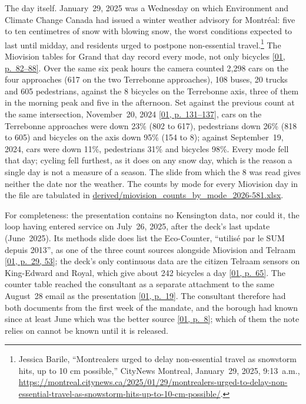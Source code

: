 \documentclass[11pt,letterpaper]{article}
\newcommand{\repourl}{https://github.com/OpenMobilityData/Terrebonne-access-requests}
\newcommand{\doc}[2]{\href{\repourl/blob/main/#1}{#2}}
\newcommand{\pagesurl}{https://openmobilitydata.github.io/Terrebonne-access-requests}
\newcommand{\pgl}[3]{\href{\pagesurl/\csname bundle#1\endcsname\#page=#2}{\textsf{\small[#1, p.~#3]}}}
\newcommand{\pg}[2]{\pgl{#1}{#2}{#2}}
\begin{document}
The day itself. January~29, 2025 was a Wednesday on which Environment and
Climate Change Canada had issued a winter weather advisory for Montr\'eal:
five to ten centimetres of snow with blowing snow, the worst conditions
expected to last until midday, and residents urged to postpone non-essential
travel.\footnote{Jessica Barile, ``Montrealers urged to delay non-essential
travel as snowstorm hits, up to 10 cm possible,'' CityNews Montreal,
January~29, 2025, 9:13~a.m.,
\url{https://montreal.citynews.ca/2025/01/29/montrealers-urged-to-delay-non-essential-travel-as-snowstorm-hits-up-to-10-cm-possible/}.}
The Miovision tables for Grand that day record every mode, not only
bicycles \pgl{01}{82}{82--88}. Over the same six peak hours the camera
counted 2{,}298 cars on the four approaches (617 on the two Terrebonne
approaches), 108 buses, 20 trucks and 605 pedestrians, against the 8
bicycles on the Terrebonne axis, three of them in the morning peak and five
in the afternoon. Set against the previous count at the same intersection,
November~20, 2024 \pgl{01}{131}{131--137}, cars on the Terrebonne
approaches were down 23\% (802 to 617), pedestrians down 26\% (818 to 605)
and bicycles on the axis down 95\% (154 to 8); against September~19, 2024,
cars were down 11\%, pedestrians 31\% and bicycles 98\%. Every mode fell
that day; cycling fell furthest, as it does on any snow day, which is the
reason a single day is not a measure of a season. The slide from which the
8 was read gives neither the date nor the weather. The counts by mode for
every Miovision day in the file are tabulated in
\doc{2026-581/derived/miovision_counts_by_mode_2026-581.xlsx}{derived/miovision\_counts\_by\_mode\_2026-581.xlsx}.

For completeness: the presentation contains no Kensington data, nor could
it, the loop having entered service on July~26, 2025, after the deck's last
update (June~2025). Its methods slide does list the Eco-Counter, ``utilis\'e
par le SUM depuis 2013'', as one of the three count sources alongside
Miovision and Telraam \pgl{01}{53}{29, 53}; the deck's only continuous data
are the citizen Telraam sensors on King-Edward and Royal, which give about
242 bicycles a day \pg{01}{65}. The counter table reached the consultant
as a separate attachment to the same August~28 email as the presentation
\pg{01}{19}. The consultant therefore had both documents from the first
week of the mandate, and the borough had known since at least June which
was the better source \pg{01}{8}; which of them the note relies on cannot
be known until it is released.
\end{document}
